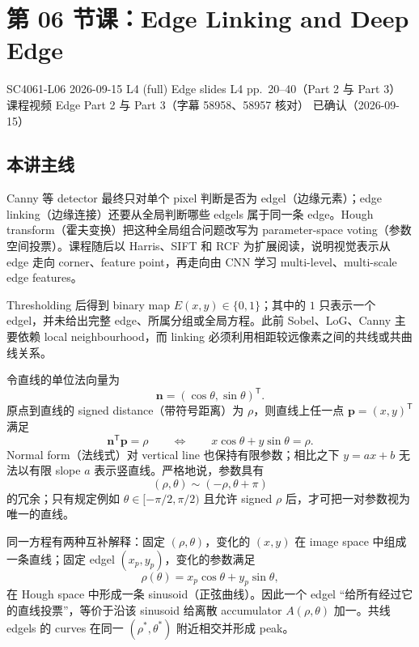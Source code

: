 
\section{第 06 节课：Edge Linking and Deep Edge}
\label{lecture:SC4061-L06}

\lecturemeta
  {SC4061-L06}
  {2026-09-15}
  {L4 (full) Edge slides}
  {L4 pp.~20--40（Part 2 与 Part 3）}
  {课程视频 Edge Part 2 与 Part 3（字幕 58958、58957 核对）}
  {已确认（2026-09-15）}

\subsection{本讲主线}

Canny 等 detector 最终只对单个 pixel 判断是否为 edgel（边缘元素）；edge linking（边缘连接）还要从全局判断哪些 edgels 属于同一条 edge。Hough transform（霍夫变换）把这种全局组合问题改写为 parameter-space voting（参数空间投票）。课程随后以 Harris、SIFT 和 RCF 为扩展阅读，说明视觉表示从 edge 走向 corner、feature point，再走向由 CNN 学习 multi-level、multi-scale edge features。


Thresholding 后得到 binary map $E(x,y)\in\{0,1\}$；其中的 $1$ 只表示一个 edgel，并未给出完整 edge、所属分组或全局方程。此前 Sobel、LoG、Canny 主要依赖 local neighbourhood，而 linking 必须利用相距较远像素之间的共线或共曲线关系。

令直线的单位法向量为
\[
  \mathbf n=(\cos\theta,\sin\theta)^{\mathsf T}.
\]
原点到直线的 signed distance（带符号距离）为 $\rho$，则直线上任一点 $\mathbf p=(x,y)^{\mathsf T}$ 满足
\[
  \boxed{\mathbf n^{\mathsf T}\mathbf p=\rho}
  \qquad\Longleftrightarrow\qquad
  \boxed{x\cos\theta+y\sin\theta=\rho}.
\]
Normal form（法线式）对 vertical line 也保持有限参数；相比之下 $y=ax+b$ 无法以有限 slope $a$ 表示竖直线。严格地说，参数具有
\[
  (\rho,\theta)\sim(-\rho,\theta+\pi)
\]
的冗余；只有规定例如 $\theta\in[-\pi/2,\pi/2)$ 且允许 signed $\rho$ 后，才可把一对参数视为唯一的直线。


同一方程有两种互补解释：固定 $(\rho,\theta)$，变化的 $(x,y)$ 在 image space 中组成一条直线；固定 edgel $(x_p,y_p)$，变化的参数满足
\[
  \rho(\theta)=x_p\cos\theta+y_p\sin\theta,
\]
在 Hough space 中形成一条 sinusoid（正弦曲线）。因此一个 edgel ``给所有经过它的直线投票''，等价于沿该 sinusoid 给离散 accumulator $A(\rho,\theta)$ 加一。共线 edgels 的 curves 在同一 $(\rho^*,\theta^*)$ 附近相交并形成 peak。

